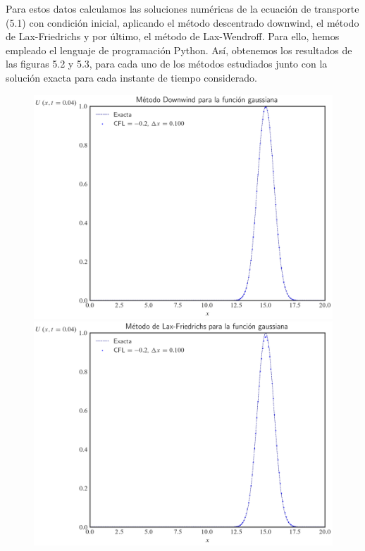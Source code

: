 Para estos datos calculamos las soluciones numéricas de la ecuación
de transporte (5.1) con condición inicial, aplicando el método
descentrado downwind, el método de Lax-Friedrichs y por último, el
método de Lax-Wendroff.
Para ello, hemos empleado el lenguaje de programación Python.
Así, obtenemos los resultados de las figuras 5.2 y 5.3, para cada uno
de los métodos estudiados junto con la solución exacta para cada
instante de tiempo considerado.

\begin{figure}[ht!]
    \centering
    \includegraphics[width=.30\paperwidth]{../snapshots/downwindgaussian1d-2.png}
    \includegraphics[width=.30\paperwidth]{../snapshots/lax-friedrichsgaussiana1d-2.png}

\end{figure}
